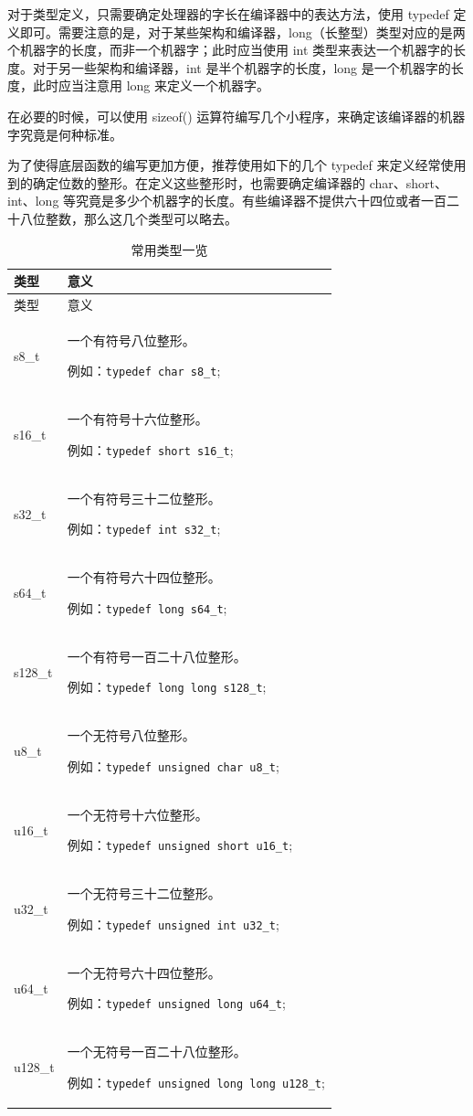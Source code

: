 对于类型定义，只需要确定处理器的字长在编译器中的表达方法，使用 typedef 定义即可。需要注意的是，对于某些架构和编译器，long（长整型）类型对应的是两个机器字的长度，而非一个机器字；此时应当使用 int 类型来表达一个机器字的长度。对于另一些架构和编译器，int 是半个机器字的长度，long 是一个机器字的长度，此时应当注意用 long 来定义一个机器字。

在必要的时候，可以使用 sizeof() 运算符编写几个小程序，来确定该编译器的机器字究竟是何种标准。

为了使得底层函数的编写更加方便，推荐使用如下的几个 typedef 来定义经常使用到的确定位数的整形。在定义这些整形时，也需要确定编译器的 char、short、int、long 等究竟是多少个机器字的长度。有些编译器不提供六十四位或者一百二十八位整数，那么这几个类型可以略去。

\begin{xltabular}{\textwidth}{@{}>{\hsize\raggedright\arraybackslash}X>{\hsize\raggedright\arraybackslash}X@{}}
\caption{常用类型一览}\label{tab:7-15-common-types-overview}\\
\toprule
类型 & 意义\tabularnewline
\endfirsthead
\toprule
类型 & 意义\tabularnewline
\midrule
\endhead
\bottomrule
\endlastfoot
s8\_t\strut
 & 一个有符号八位整形。

例如：\texttt{typedef char s8\_t};\strut
\tabularnewline
s16\_t\strut
 & 一个有符号十六位整形。

例如：\texttt{typedef short s16\_t};\strut
\tabularnewline
s32\_t\strut
 & 一个有符号三十二位整形。

例如：\texttt{typedef int s32\_t};\strut
\tabularnewline
s64\_t\strut
 & 一个有符号六十四位整形。

例如：\texttt{typedef long s64\_t};\strut
\tabularnewline
s128\_t\strut
 & 一个有符号一百二十八位整形。

例如：\texttt{typedef long long s128\_t};\strut
\tabularnewline
u8\_t\strut
 & 一个无符号八位整形。

例如：\texttt{typedef unsigned char u8\_t};\strut
\tabularnewline
u16\_t\strut
 & 一个无符号十六位整形。

例如：\texttt{typedef unsigned short u16\_t};\strut
\tabularnewline
u32\_t\strut
 & 一个无符号三十二位整形。

例如：\texttt{typedef unsigned int u32\_t};\strut
\tabularnewline
u64\_t\strut
 & 一个无符号六十四位整形。

例如：\texttt{typedef unsigned long u64\_t};\strut
\tabularnewline
u128\_t\strut
 & 一个无符号一百二十八位整形。

例如：\texttt{typedef unsigned long long u128\_t};\strut
\tabularnewline
\end{xltabular}

